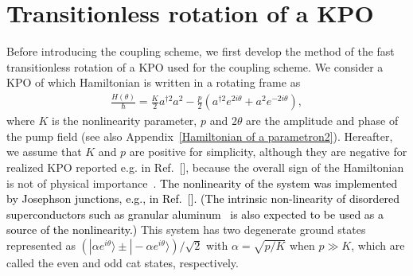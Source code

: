 \documentclass[%
 reprint,
 amsmath,amssymb,
 aps,
pra,
]{revtex4-2}
\begin{document}
\section{Transitionless rotation of a KPO}
Before introducing the coupling scheme, we first develop the method of the fast transitionless rotation of a KPO used for the coupling scheme.
We consider a KPO of which Hamiltonian is written in a rotating frame as~\cite{Wielinga1993,Cochrane1999,Goto2019}
\begin{eqnarray}
\frac{H(\theta)}{\hbar} = \frac{K}{2}a^{\dagger 2} a^2 - \frac{p}{2} (a^{\dagger 2}e^{2i\theta} + a^2e^{-2i\theta}), 
\label{H_1_24_22}
\end{eqnarray}
where $K$ is the nonlinearity parameter, $p$ and $2\theta$ are the amplitude and phase of the pump field (see also Appendix~\ref{Hamiltonian of a parametron2}).
Hereafter, we assume that $K$ and $p$ are positive for simplicity, although they are negative for realized KPO reported e.g. in Ref.~[], because the overall sign of the Hamiltonian is not of physical importance~\cite{Goto2019}.
\textcolor{black}{The nonlinearity of the system was implemented by Josephson junctions, e.g., in Ref.~[]. (The intrinsic non-linearity of disordered superconductors such as granular aluminum~\cite{Winkel2020} is also expected to be used as a source of the nonlinearity.)}
This system has two degenerate ground states represented as $(|\alpha e^{i\theta} \rangle \pm |-\alpha e^{i\theta} \rangle)/\sqrt{2}$ with $\alpha=\sqrt{p/K}$ when $p\gg K$, which are called the even and odd cat states, respectively. 
\end{document}
